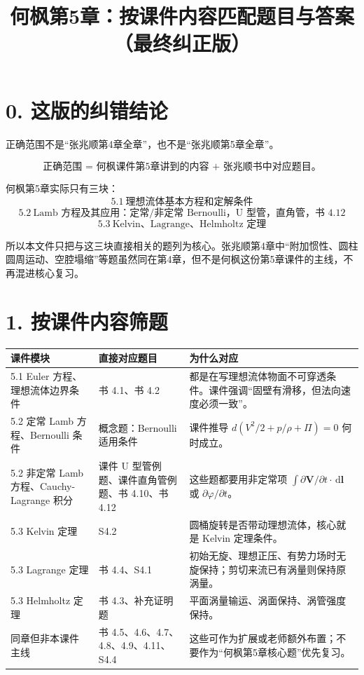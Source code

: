 ﻿\documentclass[UTF8,zihao=-4]{ctexart}
\title{\bfseries 何枫第5章：按课件内容匹配题目与答案（最终纠正版）}
\author{}
\date{}
\newcommand{\dd}{\,\mathrm d}
\newcommand{\core}[1]{\textcolor{blue!65!black}{#1}}
\begin{document}
\maketitle

\section*{0. 这版的纠错结论}

正确范围不是“张兆顺第4章全章”，也不是“张兆顺第5章全章”。

\[
\boxed{\text{正确范围 = 何枫课件第5章讲到的内容 + 张兆顺书中对应题目。}}
\]

何枫第5章实际只有三块：
\[
5.1\ \text{理想流体基本方程和定解条件}
\]
\[
5.2\ \text{Lamb 方程及其应用：定常/非定常 Bernoulli，U 型管，直角管，书 4.12}
\]
\[
5.3\ \text{Kelvin、Lagrange、Helmholtz 定理}
\]

所以本文件只把与这三块直接相关的题列为核心。张兆顺第4章中“附加惯性、圆柱圆周运动、空腔塌缩”等题虽然同在第4章，但不是何枫这份第5章课件的主线，不再混进核心复习。

\section*{1. 按课件内容筛题}

\begin{longtable}{p{3.2cm}p{5.2cm}p{6.6cm}}
\toprule
课件模块 & 直接对应题目 & 为什么对应 \\
\midrule
5.1 Euler 方程、理想流体边界条件 & \core{书 4.1、书 4.2} & 都是在写理想流体物面不可穿透条件。课件强调“固壁有滑移，但法向速度必须一致”。\\
5.2 定常 Lamb 方程、Bernoulli 条件 & \core{概念题：Bernoulli 适用条件} & 课件推导 \(d(V^2/2+p/\rho+\Pi)=0\) 何时成立。\\
5.2 非定常 Lamb 方程、Cauchy-Lagrange 积分 & \core{课件 U 型管例题、课件直角管例题、书 4.10、书 4.12} & 这些题都要用非定常项 \(\int \partial\bm V/\partial t\cdot \dd\bm l\) 或 \(\partial\varphi/\partial t\)。\\
5.3 Kelvin 定理 & \core{S4.2} & 圆桶旋转是否带动理想流体，核心就是 Kelvin 定理条件。\\
5.3 Lagrange 定理 & \core{书 4.4、S4.1} & 初始无旋、理想正压、有势力场时无旋保持；剪切来流已有涡量则保持原涡量。\\
5.3 Helmholtz 定理 & \core{书 4.3、补充证明题} & 平面涡量输运、涡面保持、涡管强度保持。\\
\midrule
同章但非本课件主线 & 书 4.5、4.6、4.7、4.8、4.9、4.11、S4.4 & 这些可作为扩展或老师额外布置；不要作为“何枫第5章核心题”优先复习。\\
\bottomrule
\end{longtable}
\end{document}
